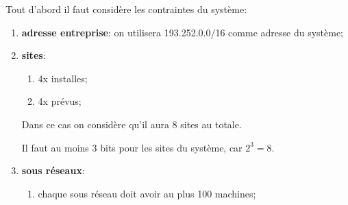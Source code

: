 \documentclass{article}
\begin{document}
\begin{resolution}
    Tout d'abord il faut considère les contraintes du système:
    \begin{enumerate}[rightmargin=\leftmargin]
        \item \textbf{adresse entreprise}: on utilisera 193.252.0.0/16 comme adresse du système;
        \item \textbf{sites}:
        \begin{enumerate}[noitemsep, rightmargin=\leftmargin]
            \item 4x installes;
            \item 4x prévus;
        \end{enumerate}
        Dans ce cas on considère qu'il aura 8 sites au totale.
        \begin{remark}
            Il faut au moins 3 bits pour les sites du système, car $2^3 = 8$.
        \end{remark}

        \item \textbf{sous réseaux}:
        \begin{enumerate}[noitemsep, rightmargin=\leftmargin]
            \item chaque sous réseau doit avoir au plus 100 machines;
        \end{enumerate}


\end{enumerate}
\end{resolution}
\end{document}
